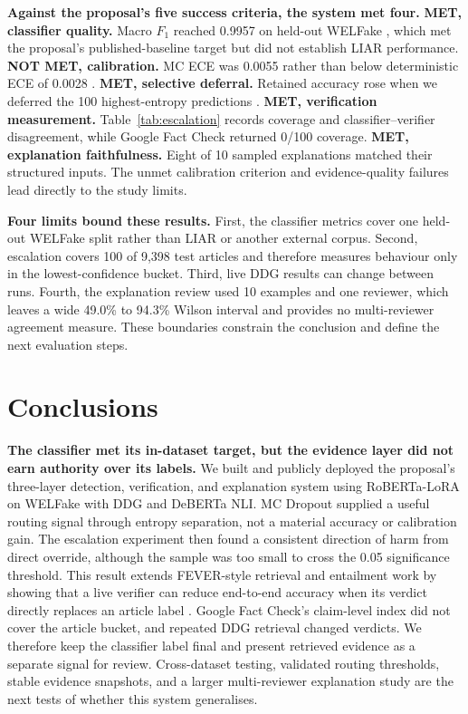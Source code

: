 \documentclass[10pt,twocolumn,letterpaper]{article}
\begin{document}
\textbf{Against the proposal's five success criteria, the system met four.}
\textbf{MET, classifier quality.} Macro $F_1$ reached 0.9957 on held-out WELFake
\cite{verma2021welfake}, which met the proposal's published-baseline target but did
not establish LIAR performance. \textbf{NOT MET, calibration.} MC ECE was 0.0055
rather than below deterministic ECE of 0.0028 \cite{guo2017calibration}.
\textbf{MET, selective deferral.} Retained accuracy rose when we deferred the 100
highest-entropy predictions \cite{geifman2017selective}. \textbf{MET, verification
measurement.} Table~\ref{tab:escalation} records coverage and classifier--verifier
disagreement, while Google Fact Check returned 0/100 coverage. \textbf{MET,
explanation faithfulness.} Eight of 10 sampled explanations matched their
structured inputs. The unmet calibration criterion and evidence-quality failures
lead directly to the study limits.

\textbf{Four limits bound these results.} First, the classifier metrics cover one
held-out WELFake split rather than LIAR or another external corpus. Second,
escalation covers 100 of 9{,}398 test articles and therefore measures behaviour
only in the lowest-confidence bucket. Third, live DDG results can change between
runs. Fourth, the explanation review used 10 examples and one reviewer, which
leaves a wide 49.0\% to 94.3\% Wilson interval and provides no multi-reviewer
agreement measure. These boundaries constrain the conclusion and define the next
evaluation steps.

\section{Conclusions}

\textbf{The classifier met its in-dataset target, but the evidence layer did not
earn authority over its labels.} We built and publicly deployed the proposal's
three-layer detection, verification, and explanation system using RoBERTa-LoRA on
WELFake with DDG and DeBERTa NLI. MC Dropout supplied a useful routing signal
through entropy separation, not a material accuracy or calibration gain. The
escalation experiment then found a consistent direction of harm from direct
override, although the sample was too small to cross the 0.05 significance
threshold. This result extends FEVER-style retrieval and entailment work by showing
that a live verifier can reduce end-to-end accuracy when its verdict directly
replaces an article label
\cite{thorne-etal-2018-fever,hanselowski-etal-2018-ukp,soleimani-etal-2020-bert}.
Google Fact Check's claim-level index did not cover the article bucket, and repeated
DDG retrieval changed verdicts. We therefore keep the classifier label final and
present retrieved evidence as a separate signal for review. Cross-dataset testing,
validated routing thresholds, stable evidence snapshots, and a larger
multi-reviewer explanation study are the next tests of whether this system
generalises.
\end{document}
